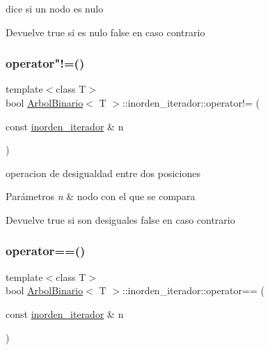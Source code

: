 dice si un nodo es nulo 

\begin{DoxyReturn}{Devuelve}
true si es nulo false en caso contrario 
\end{DoxyReturn}
\mbox{\label{classArbolBinario_1_1inorden__iterador_a783f6a48c29594dde6ddf8f477989ac2}} 
\subsubsection{\texorpdfstring{operator"!=()}{operator!=()}}
{\footnotesize\ttfamily template$<$class T$>$ \\
bool \hyperlink{classArbolBinario}{Arbol\+Binario}$<$ T $>$\+::inorden\+\_\+iterador\+::operator!= (\begin{DoxyParamCaption}\item[{const \hyperlink{classArbolBinario_1_1inorden__iterador}{inorden\+\_\+iterador} \&}]{n }\end{DoxyParamCaption})\hspace{0.3cm}{\ttfamily [inline]}}



operacion de desigualdad entre dos posiciones 


\begin{DoxyParams}{Parámetros}
{\em n} & nodo con el que se compara \\
\hline
\end{DoxyParams}
\begin{DoxyReturn}{Devuelve}
true si son desiguales false en caso contrario 
\end{DoxyReturn}
\mbox{\label{classArbolBinario_1_1inorden__iterador_aeb20011529e5d235be3f001d55ca330f}} 
\subsubsection{\texorpdfstring{operator==()}{operator==()}}
{\footnotesize\ttfamily template$<$class T$>$ \\
bool \hyperlink{classArbolBinario}{Arbol\+Binario}$<$ T $>$\+::inorden\+\_\+iterador\+::operator== (\begin{DoxyParamCaption}\item[{const \hyperlink{classArbolBinario_1_1inorden__iterador}{inorden\+\_\+iterador} \&}]{n }\end{DoxyParamCaption})\hspace{0.3cm}{\ttfamily [inline]}}



